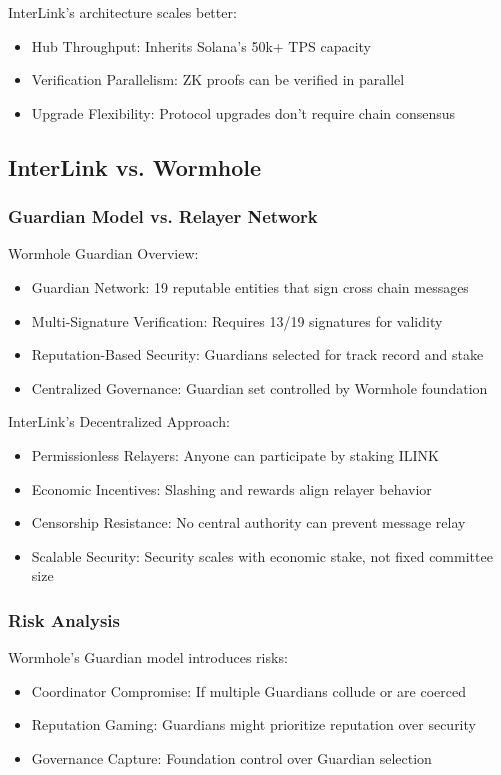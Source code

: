 \documentclass[11pt,a4paper]{article}
\begin{document}
InterLink's architecture scales better:
\begin{itemize}
    \item Hub Throughput: Inherits Solana's 50k+ TPS capacity
    \item Verification Parallelism: ZK proofs can be verified in parallel
    \item Upgrade Flexibility: Protocol upgrades don't require chain consensus
\end{itemize}

\subsection{InterLink vs. Wormhole}

\subsubsection{Guardian Model vs. Relayer Network}

Wormhole Guardian Overview:
\begin{itemize}
    \item Guardian Network: 19 reputable entities that sign cross chain messages
    \item Multi-Signature Verification: Requires 13/19 signatures for validity
    \item Reputation-Based Security: Guardians selected for track record and stake
    \item Centralized Governance: Guardian set controlled by Wormhole foundation
\end{itemize}

InterLink's Decentralized Approach:
\begin{itemize}
    \item Permissionless Relayers: Anyone can participate by staking ILINK
    \item Economic Incentives: Slashing and rewards align relayer behavior
    \item Censorship Resistance: No central authority can prevent message relay
    \item Scalable Security: Security scales with economic stake, not fixed committee size
\end{itemize}

\subsubsection{Risk Analysis}

Wormhole's Guardian model introduces risks:
\begin{itemize}
    \item Coordinator Compromise: If multiple Guardians collude or are coerced
    \item Reputation Gaming: Guardians might prioritize reputation over security
    \item Governance Capture: Foundation control over Guardian selection
\end{itemize}
\end{document}
